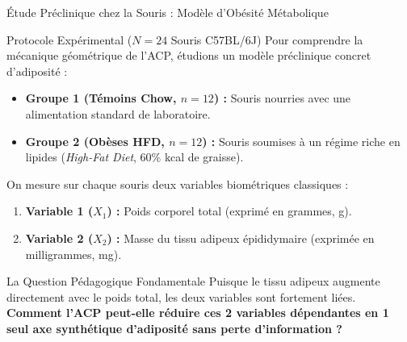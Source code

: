 \documentclass[aspectratio=169,10pt]{beamer}
\begin{document}
\begin{frame}{Étude Préclinique chez la Souris : Modèle d'Obésité Métabolique}
  \begin{biobox}{Protocole Expérimental ($N = 24$ Souris C57BL/6J)}
    \footnotesize
    Pour comprendre la mécanique géométrique de l'ACP, étudions un modèle préclinique concret d'adiposité :
    \begin{itemize}
      \item \textbf{Groupe 1 (Témoins Chow, $n = 12$) :} Souris nourries avec une alimentation standard de laboratoire.
      \item \textbf{Groupe 2 (Obèses HFD, $n = 12$) :} Souris soumises à un régime riche en lipides (\textit{High-Fat Diet}, 60\% kcal de graisse).
    \end{itemize}
    On mesure sur chaque souris deux variables biométriques classiques :
    \begin{enumerate}
      \item \textbf{Variable 1 ($X_1$) :} Poids corporel total (exprimé en grammes, g).
      \item \textbf{Variable 2 ($X_2$) :} Masse du tissu adipeux épididymaire (exprimée en milligrammes, mg).
    \end{enumerate}
  \end{biobox}
  \vspace{1mm}
  \begin{conceptbox}{La Question Pédagogique Fondamentale}
    \footnotesize
    Puisque le tissu adipeux augmente directement avec le poids total, les deux variables sont fortement liées.\\
    \textbf{Comment l'ACP peut-elle réduire ces 2 variables dépendantes en 1 seul axe synthétique d'adiposité sans perte d'information ?}
  \end{conceptbox}
\end{frame}
\end{document}
